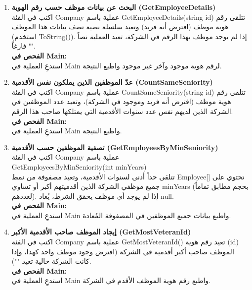 \documentclass[14pt]{extarticle}
\begin{document}
\begin{enumerate}[resume, label=\textbf{تمرين \arabic*:}, wide=0pt, leftmargin=*, itemsep=2em]
    \clearpage
    \item \textbf{البحث عن بيانات موظف حسب رقم الهوية (\textenglish{GetEmployeeDetails})} \\
    اكتب في الفئة \textenglish{Company} عملية باسم \textenglish{GetEmployeeDetails(string id)} تتلقى رقم هوية موظف (افترض أنه فريد) وتعيد سلسلة نصية تصف بيانات هذا الموظف (استخدم \textenglish{ToString()}). إذا لم يوجد موظف بهذا الرقم في الشركة، تعيد العملية نصاً فارغاً \textenglish{""}. \\
    \textbf{الفحص في \textenglish{Main}:} \\
    استدعِ العملية في \textenglish{Main} لرقم هوية موجود وآخر غير موجود واطبع النتيجة.

    \item \textbf{عدّ الموظفين الذين يملكون نفس الأقدمية (\textenglish{CountSameSeniority})} \\
    اكتب في الفئة \textenglish{Company} عملية باسم \textenglish{CountSameSeniority(string id)} تتلقى رقم هوية موظف (افترض أنه فريد وموجود في الشركة)، وتعيد عدد الموظفين في الشركة الذين لديهم نفس عدد سنوات الأقدمية التي يمتلكها صاحب هذا الرقم. \\
    \textbf{الفحص في \textenglish{Main}:} \\
    استدعِ العملية في \textenglish{Main} واطبع النتيجة.

    \item \textbf{تصفية الموظفين حسب الأقدمية (\textenglish{GetEmployeesByMinSeniority})} \\
    اكتب في الفئة \textenglish{Company} عملية باسم \\
    \textenglish{GetEmployeesByMinSeniority(int minYears)} \\
    تتلقى حداً أدنى لسنوات الأقدمية، وتعيد مصفوفة من نمط \textenglish{Employee[]} تحتوي على جميع موظفي الشركة الذين أقدميتهم أكبر أو تساوي \textenglish{minYears} (بحجم مطابق تماماً لعددهم). إذا لم يوجد أي موظف يحقق الشرط، يُعاد \textenglish{null}. \\
    \textbf{الفحص في \textenglish{Main}:} \\
    استدعِ العملية في \textenglish{Main} واطبع بيانات جميع الموظفين في المصفوفة المُعادة.

    \item \textbf{إيجاد الموظف صاحب الأقدمية الأكبر (\textenglish{GetMostVeteranId})} \\
    اكتب في الفئة \textenglish{Company} عملية باسم \textenglish{GetMostVeteranId()} تعيد رقم هوية (\textenglish{id}) الموظف صاحب أكبر أقدمية في الشركة (افترض وجود موظف واحد كهذا، وإذا كانت الشركة خالية تعيد \textenglish{""}). \\
    \textbf{الفحص في \textenglish{Main}:} \\
    استدعِ العملية في \textenglish{Main} واطبع رقم هوية الموظف الأقدم في الشركة.

\end{enumerate}
\end{document}
